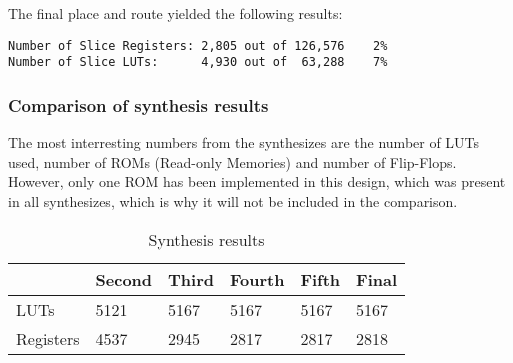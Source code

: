 

The final place and route yielded the following results:
\begin{verbatim}
Number of Slice Registers: 2,805 out of 126,576    2%
Number of Slice LUTs:      4,930 out of  63,288    7%
\end{verbatim}

\subsubsection{Comparison of synthesis results}
The most interresting numbers from the synthesizes are the number of 
LUTs used, number of ROMs (Read-only Memories) and number of 
Flip-Flops. However, only one ROM has been implemented in this design, 
which was present in all synthesizes, which is why it will not be 
included in the comparison.

\begin{table}[h!]
  \centering
  \begin{tabular}{l | l | l | l | l | l}
    & Second & Third & Fourth & Fifth & Final \\ \hline
    LUTs       & 5121   & 5167  & 5167   & 5167  & 5167  \\ \hline
    Registers  & 4537   & 2945  & 2817   & 2817  & 2818  \\
  \end{tabular}
  \caption{Synthesis results}
  \label{table:synthesis}
\end{table}

